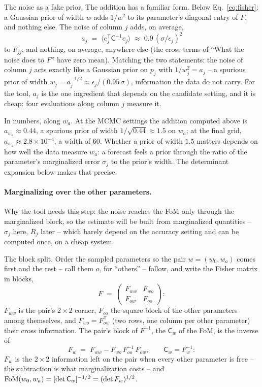 \documentclass[11pt]{article}
\newcommand{\Cov}{\mathsf{C}}
\newcommand{\T}{^{\mathsf{T}}}
\begin{document}
The noise as a fake prior.  The addition has a familiar form.  Below
Eq.~\eqref{eq:fisher}: a Gaussian prior of width $w$ adds $1/w^2$ to
its parameter's diagonal entry of $F$, and nothing else.  The noise of
column $j$ adds, on average,
\begin{equation}
  a_j \;=\; \langle e_j\T\Cov^{-1}e_j\rangle
  \;\approx\; 0.9\,(\sigma/\epsilon_j)^2
  \label{eq:spuriousprior}
\end{equation}
to $F_{jj}$, and nothing, on average, anywhere else (the cross terms
of ``What the noise does to $F$'' have zero mean).  Matching the two
statements: the noise of column $j$ acts exactly like a Gaussian prior
on $p_j$ with $1/w_j^2 = a_j$ -- a spurious prior of width
$w_j = a_j^{-1/2} \approx \epsilon_j/(0.95\,\sigma)$, information the
data do not carry.  For the tool, $a_j$ is the one ingredient that
depends on the candidate setting, and it is cheap: four evaluations
along column $j$ measure it.

In numbers, along $w_a$.  At the MCMC settings the addition computed
above is $a_{w_a} \approx 0.44$, a spurious prior of width
$1/\sqrt{0.44} \approx 1.5$ on $w_a$; at the final grid,
$a_{w_a} \approx 2.8\times10^{-4}$, a width of $60$.  Whether a prior
of width $1.5$ matters depends on how well the data measure $w_a$: a
forecast feels a prior through the ratio of the parameter's
marginalized error $\sigma_j$ to the prior's width.  The determinant
expansion below makes that precise.

\paragraph{Marginalizing over the other parameters.}
Why the tool needs this step: the noise reaches the FoM only
through the marginalized block, so the estimate will be built from
marginalized quantities -- $\sigma_j$ here, $R_j$ later -- which
barely depend on the accuracy setting and can be computed once, on
a cheap system.

The block split.  Order the sampled parameters so the pair
$w = (w_0, w_a)$ comes first and the rest -- call them $o$, for
``others'' -- follow, and write the Fisher matrix in blocks,
\begin{equation*}
  F \;=\;
  \begin{pmatrix} F_{ww} & F_{wo} \\ F_{ow} & F_{oo} \end{pmatrix} :
\end{equation*}
$F_{ww}$ is the pair's $2 \times 2$ corner, $F_{oo}$ the square block
of the other parameters among themselves, and $F_{wo} = F_{ow}\T$
(two rows, one column per other parameter) their cross information.
The pair's block of $F^{-1}$, the $\Cov_w$ of the FoM, is the inverse
of
\begin{equation}
  F_w \;=\; F_{ww} - F_{wo}\,F_{oo}^{-1}\,F_{ow} ,
  \qquad
  \Cov_w = F_w^{-1} :
  \label{eq:schurpair}
\end{equation}
$F_w$ is the $2 \times 2$ information left on the pair when every
other parameter is free -- the subtraction is what marginalization
costs -- and ${\rm FoM}(w_0, w_a) = [\det\Cov_w]^{-1/2}
= (\det F_w)^{1/2}$.
\end{document}
